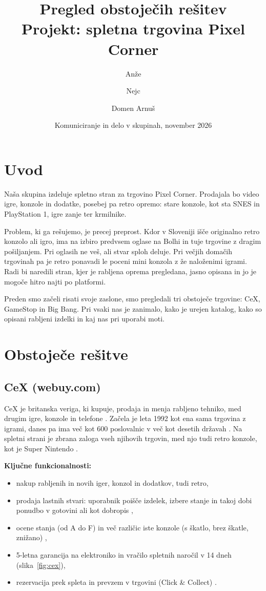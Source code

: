 \documentclass[11pt,a4paper]{article}
\title{\textbf{Pregled obstoječih rešitev}\\[4pt]
\large Projekt: spletna trgovina Pixel Corner}
\author{Anže \and Nejc \and Domen Arnuš}
\date{Komuniciranje in delo v skupinah, november 2026}
\begin{document}
\maketitle

\section{Uvod}

Naša skupina izdeluje spletno stran za trgovino Pixel Corner. Prodajala bo video igre, konzole in dodatke, posebej pa retro opremo: stare konzole, kot sta SNES in PlayStation 1, igre zanje ter krmilnike.

Problem, ki ga rešujemo, je precej preprost. Kdor v Sloveniji išče originalno retro konzolo ali igro, ima na izbiro predvsem oglase na Bolhi in tuje trgovine z dragim pošiljanjem. Pri oglasih ne veš, ali stvar sploh deluje. Pri večjih domačih trgovinah pa je \glqq retro\grqq{} ponavadi le poceni mini konzola z že naloženimi igrami. Radi bi naredili stran, kjer je rabljena oprema pregledana, jasno opisana in jo je mogoče hitro najti po platformi.

Preden smo začeli risati svoje zaslone, smo pregledali tri obstoječe trgovine: CeX, GameStop in Big Bang. Pri vsaki nas je zanimalo, kako je urejen katalog, kako so opisani rabljeni izdelki in kaj nas pri uporabi moti.

\section{Obstoječe rešitve}

\subsection{CeX (webuy.com)}

CeX je britanska veriga, ki kupuje, prodaja in menja rabljeno tehniko, med drugim igre, konzole in telefone \cite{cex}. Začela je leta 1992 kot ena sama trgovina z igrami, danes pa ima več kot 600 poslovalnic v več kot desetih državah \cite{cex-zgodovina}. Na spletni strani je zbrana zaloga vseh njihovih trgovin, med njo tudi retro konzole, kot je Super Nintendo \cite{cex-clanek}.

\textbf{Ključne funkcionalnosti:}
\begin{itemize}
  \item nakup rabljenih in novih iger, konzol in dodatkov, tudi retro,
  \item prodaja lastnih stvari: uporabnik poišče izdelek, izbere stanje in takoj dobi ponudbo v gotovini ali kot dobropis \cite{cex-prodaja},
  \item ocene stanja (od A do F) in več različic iste konzole (s škatlo, brez škatle, znižano) \cite{cex-clanek},
  \item 5-letna garancija na elektroniko in vračilo spletnih naročil v 14 dneh \cite{cex} (slika~\ref{fig:cex}),
  \item rezervacija prek spleta in prevzem v trgovini (Click \& Collect) \cite{cex-zgodovina}.
\end{itemize}
\end{document}
